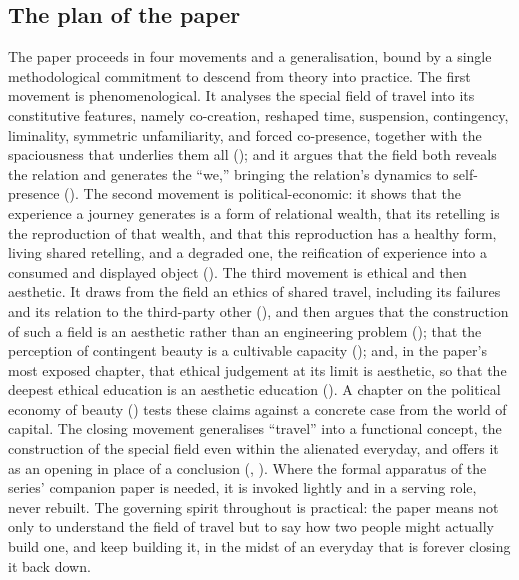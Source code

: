 \subsection{The plan of the paper}
\label{p21:sub:intro-plan}

The paper proceeds in four movements and a generalisation, bound by a single methodological commitment to descend from theory into practice. The first movement is phenomenological. It analyses the special field of travel into its constitutive features, namely co-creation, reshaped time, suspension, contingency, liminality, symmetric unfamiliarity, and forced co-presence, together with the spaciousness that underlies them all (); and it argues that the field both reveals the relation and generates the ``we,'' bringing the relation's dynamics to self-presence (). The second movement is political-economic: it shows that the experience a journey generates is a form of relational wealth, that its retelling is the reproduction of that wealth, and that this reproduction has a healthy form, living shared retelling, and a degraded one, the reification of experience into a consumed and displayed object (). The third movement is ethical and then aesthetic. It draws from the field an ethics of shared travel, including its failures and its relation to the third-party other (), and then argues that the construction of such a field is an aesthetic rather than an engineering problem (); that the perception of contingent beauty is a cultivable capacity (); and, in the paper's most exposed chapter, that ethical judgement at its limit is aesthetic, so that the deepest ethical education is an aesthetic education (). A chapter on the political economy of beauty () tests these claims against a concrete case from the world of capital. The closing movement generalises ``travel'' into a functional concept, the construction of the special field even within the alienated everyday, and offers it as an opening in place of a conclusion (, ). Where the formal apparatus of the series' companion paper is needed, it is invoked lightly and in a serving role, never rebuilt. The governing spirit throughout is practical: the paper means not only to understand the field of travel but to say how two people might actually build one, and keep building it, in the midst of an everyday that is forever closing it back down.
